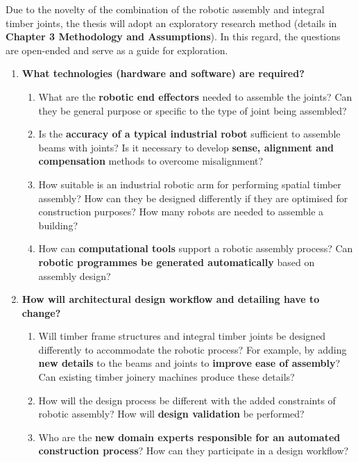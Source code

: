 \documentclass[11pt]{book}
\begin{document}
Due to the novelty of the combination of the robotic assembly and integral timber joints, the thesis will adopt an exploratory research method (details in \textbf{Chapter 3 Methodology and Assumptions}). In this regard, the questions are open-ended and serve as a guide for exploration. 

\begin{enumerate}
	\item \textbf{What technologies (hardware and software) are required?}

\begin{enumerate}
	\item What are the \textbf{robotic end effectors} needed to assemble the joints? Can they be general purpose or specific to the type of joint being assembled?

	\item Is the \textbf{accuracy of a typical industrial robot }sufficient to assemble beams with joints? Is it necessary to develop \textbf{sense, alignment and compensation }methods to overcome misalignment?

	\item How suitable is an industrial robotic arm for performing spatial timber assembly? How can they be designed differently if they are optimised for construction purposes? How many robots are needed to assemble a building?

	\item How can \textbf{computational tools }support a robotic assembly process? Can \textbf{robotic programmes be generated automatically} based on assembly design?

\end{enumerate}
	\item \textbf{How will architectural design workflow and detailing have to change?}

\begin{enumerate}
	\item Will timber frame structures and integral timber joints be designed differently to accommodate the robotic process? For example, by adding \textbf{new details }to the beams and joints to \textbf{improve ease of assembly}? Can existing timber joinery machines produce these details?

	\item How will the design process be different with the added constraints of robotic assembly? How will \textbf{design validation }be performed?

	\item Who are the \textbf{new domain experts responsible for an automated construction process}? How can they participate in a design workflow?


\end{enumerate}
\end{enumerate}
\end{document}
